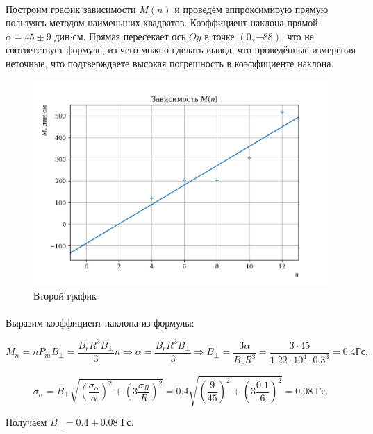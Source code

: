 \documentclass[a4paper,12pt]{article} %
\begin{document}
\paragraph{} Построим график зависимости $M(n)$ и проведём аппроксимирую прямую пользуясь методом наименьших квадратов. Коэффициент наклона прямой $\alpha = 45 \pm 9$ дин$\cdot$см. Прямая пересекает ось $Oy$ в точке $(0,-88)$, что не соответствует формуле, из чего можно сделать вывод, что проведённые измерения неточные, что подтверждаете высокая погрешность  в коэффициенте наклона.

\begin{figure}
\begin{center}
\includegraphics[width=6in]{plot2.png}
\caption{Второй график}
\label{plot2}
\end{center}
\end{figure}

\paragraph{} Выразим коэффициент наклона из формулы:

\[ M_n = n P_m B_\perp = \frac{B_r R^3 B_\perp}{3}n \Rightarrow \alpha = \frac{B_r R^3 B_\perp}{3} \Rightarrow B_\perp = \frac{3 \alpha}{B_r R^3} = \frac{3 \cdot 45}{1.22 \cdot 10^{4} \cdot 0.3^3} = 0.4 \text{Гс},
\]

\[ \sigma_\alpha = B_\perp  \sqrt{\left( \frac{\sigma_\alpha}{\alpha} \right)^2 + \left(  3 \frac{\sigma_R}{R} \right)^2} = 0.4 \sqrt{\left( \frac{9}{45} \right)^2 + \left(  3 \frac{0.1}{6} \right)^2} = 0.08 \; \text{Гс}.
\]

Получаем $B_\perp = 0.4 \pm 0.08$ Гс.
\end{document}
